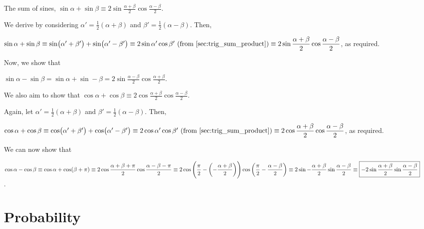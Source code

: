 \documentclass[a4paper,11pt]{article}
\begin{document}

    The sum of sines, $\displaystyle \boxed{\sin \alpha + \sin \beta \equiv
        2 \sin \frac{\alpha + \beta}2 \cos \frac{\alpha - \beta}2}$.

    We derive by considering $\alpha' = \frac 12 (\alpha + \beta)$ and
    $\beta' = \frac 12 (\alpha - \beta)$. Then,

    $\sin \alpha + \sin \beta \equiv
     \sin(\alpha' + \beta') + \sin(\alpha' - \beta') \equiv
     2\sin \alpha' \cos \beta'\ \text{(from \ref{sec:trig_sum_product})}
     \\\\\equiv
    \displaystyle
        2 \sin \frac{\alpha + \beta}2 \cos \frac{\alpha - \beta}2$, as required.

    Now, we show that

    $\displaystyle \boxed{\sin \alpha - \sin \beta =
        \sin \alpha + \sin -\beta =
        2 \sin \frac{\alpha - \beta} 2 \cos\frac{\alpha + \beta} 2}$.

    We also aim to show that
    $\displaystyle \boxed{\cos \alpha + \cos \beta \equiv
        2 \cos\frac{\alpha + \beta} 2 \cos \frac{\alpha - \beta} 2}$.

    Again, let $\alpha' = \frac 12 (\alpha + \beta)$ and
    $\beta' = \frac 12 (\alpha - \beta)$. Then,

    $\cos \alpha + \cos \beta \equiv
     \cos(\alpha' + \beta') + \cos(\alpha' - \beta') \equiv
     2\cos \alpha' \cos \beta'\ \text{(from \ref{sec:trig_sum_product})}
     \\\\\equiv
     \displaystyle
        2 \cos\frac{\alpha + \beta} 2 \cos \frac{\alpha - \beta} 2$,
    as required.

    We can now show that

    $\displaystyle \cos \alpha - \cos \beta \equiv
     \cos \alpha + \cos (\beta + \pi)  \equiv
     2 \cos \frac{\alpha + \beta + \pi} 2 \cos \frac {\alpha - \beta - \pi} 2
     \\\equiv
     2 \cos \pqty{\frac \pi 2 - \pqty{-\frac{\alpha + \beta} 2}}
       \cos \pqty{\frac \pi 2 - \frac{\alpha - \beta} 2} \equiv
     2 \sin -\frac{\alpha + \beta} 2 \sin \frac{\alpha - \beta} 2 \\\\\equiv
     \boxed{-2 \sin \frac{\alpha + \beta} 2 \sin \frac{\alpha - \beta} 2}$.

    \section{Probability}
\end{document}
